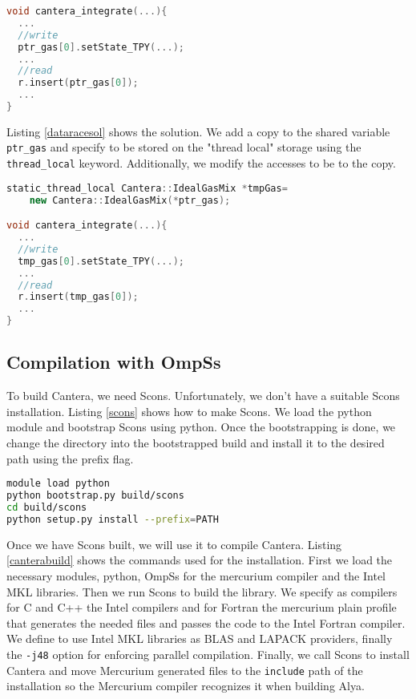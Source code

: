 \begin{lstlisting}[language=c++, caption={Race condition in cantera\_integrate.}, label={datarace}]
void cantera_integrate(...){
  ...
  //write
  ptr_gas[0].setState_TPY(...);
  ...
  //read
  r.insert(ptr_gas[0]);
  ...
}
\end{lstlisting}

Listing \ref{dataracesol} shows the solution. We add a copy to the shared variable \texttt{ptr\_gas}  and specify to be stored on the "thread local" storage using the \texttt{thread\_local} keyword. Additionally, we modify the accesses to be to the copy.
\begin{lstlisting}[language=c++, caption={Copy of ptr\_gas data structure.}, label={dataracesol}]
static_thread_local Cantera::IdealGasMix *tmpGas=
    new Cantera::IdealGasMix(*ptr_gas);

void cantera_integrate(...){
  ...
  //write
  tmp_gas[0].setState_TPY(...);
  ...
  //read
  r.insert(tmp_gas[0]);
  ...
}
\end{lstlisting}


\subsection{Compilation with OmpSs}


To build Cantera, we need Scons. Unfortunately, we don't have a suitable Scons installation. Listing \ref{scons} shows how to make Scons. We load the python module and bootstrap Scons using python. Once the bootstrapping is done, we change the directory into the bootstrapped build and install it to the desired path using the prefix flag. 

\begin{lstlisting}[language=sh, caption={Scons build.}, label={scons}]
module load python
python bootstrap.py build/scons
cd build/scons
python setup.py install --prefix=PATH
\end{lstlisting}

Once we have Scons built, we will use it to compile Cantera. Listing \ref{canterabuild} shows the commands used for the installation. First we load the necessary modules, python, OmpSs for the mercurium compiler and the Intel MKL libraries. Then we run Scons to build the library. We specify as compilers for C and C++ the Intel compilers and for Fortran the mercurium plain profile that generates the needed files and passes the code to the Intel Fortran compiler. We define to use Intel MKL libraries as BLAS and LAPACK providers, finally the \texttt{-j48} option for enforcing parallel compilation. Finally, we call Scons to install Cantera and move Mercurium generated files to the \texttt{include} path of the installation so the Mercurium compiler recognizes it when building Alya. 

